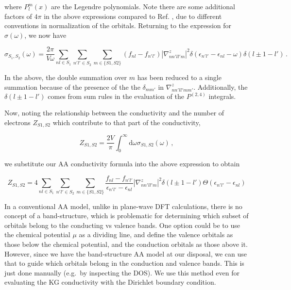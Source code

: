 \documentclass[11pt]{article}
\begin{document}
where \(P_l^m(x)\) are the Legendre polynomials. Note there are some
additional factors of \(4\pi\) in the above expressions compared to Ref.
, due to different conventions in
normalization of the orbitals. Returning to the expression for
\(\sigma(\omega)\), we now have

\begin{equation}
\sigma_{S_1,S_2}(\omega) = \frac{2\pi}{V\omega} \sum_{nl\in S_1} \sum_{n'l'\in S_2} \sum_{m\in \{S1,S2\}} (f_{nl} - f_{n'l'}) |\nabla_{nn'll'm}^z|^2 \delta (\epsilon_{n'l'} - \epsilon_{nl} - \omega) \delta(l\pm 1 - l')\,.
\end{equation}

In the above, the double summation over \(m\) has been reduced to a
single summation because of the presence of the the \(\delta_{mm'}\) in
\(\nabla_{nn'll'mm'}^z\). Additionally, the \(\delta(l\pm 1 - l')\)
comes from sum rules in the evaluation of the \(P^{(2,4)}\) integrals.

Now, noting the relationship between the conductivity and the number of
electrons \(Z_{S1,S2}\) which contribute to that part of the
conductivity,

\begin{equation}
Z_{S1,S2} = \frac{2V}{\pi} \int_0^\infty \textrm{d}\omega \sigma_{S1,S2}(\omega)\,, 
\end{equation}

we substitute our AA conductivity formula into the above expression to
obtain

\begin{equation}
Z_{S1,S2} = 4 \sum_{nl\in S_1} \sum_{n'l'\in S_2} \sum_{m\in \{S1,S2\}} \frac{f_{nl} - f_{n'l'}}{\epsilon_{n'l'}-\epsilon_{nl}}|\nabla_{nn'll'm}^z|^2 \delta(l\pm 1 - l') \Theta (\epsilon_{n'l'}-\epsilon_{nl})
\end{equation}

In a conventional AA model, unlike in plane-wave DFT calculations, there
is no concept of a band-structure, which is problematic for determining
which subset of orbitals belong to the conducting vs valence bands. One
option could be to use the chemical potential \(\mu\) as a dividing
line, and define the valence orbitals as those below the chemical
potential, and the conduction orbitals as those above it. However, since
we have the band-structure AA model at our disposal, we can use that to
guide which orbitals belong in the conduction and valence bands. This is
just done manually (e.g.~by inspecting the DOS). We use this method even
for evaluating the KG conductivity with the Dirichlet boundary
condition.
\end{document}
